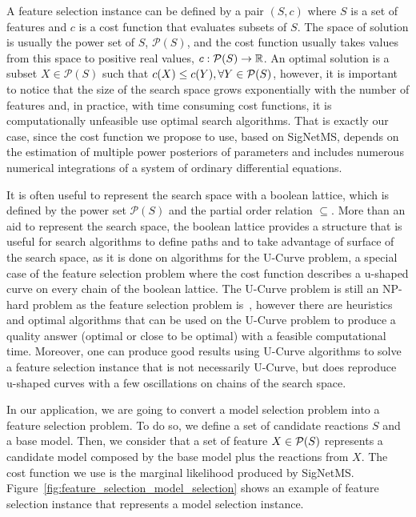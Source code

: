 A feature selection instance can be defined by a pair $(S, c)$ where $S$
is a set of features and $c$ is a cost function that evaluates subsets
of $S$. The space of solution is usually the power set of $S$,
$\mathcal{P}(S)$, and the cost function usually takes values from this 
space to positive real values, $c: \mathcal{P}(S) \to \mathbb{R}$. An
optimal solution is a subset $X \in \mathcal{P}(S)$ such that $c(X) \leq
c(Y), \forall Y \in \mathcal{P} (S)$, however, it is important to notice
that the size of the search space grows exponentially with the number of
features and, in practice, with time consuming cost functions, it is
computationally unfeasible use optimal search algorithms. That is
exactly our case, since the cost function we propose to use, based on
SigNetMS, depends on the estimation of multiple power posteriors of
parameters and includes numerous numerical integrations of a system of
ordinary differential equations.

It is often useful to represent the search space with a boolean lattice, 
which is defined by the power set $\mathcal{P}(S)$ and the partial order 
relation $\subseteq$. More than an aid to represent the search space,
the boolean lattice provides a structure that is useful for search
algorithms to define paths and to take advantage of surface of the 
search space, as it is done on algorithms for the U-Curve problem, a 
special case of the feature selection problem where the cost function 
describes a u-shaped curve on every chain of the boolean lattice. The
U-Curve problem is still an NP-hard problem as the feature selection
problem is~\cite{Rei12}, however there are heuristics and optimal
algorithms that can be used on the U-Curve problem to produce a quality
answer (optimal or close to be optimal) with a feasible computational
time. Moreover, one can produce good results using U-Curve algorithms to 
solve a feature selection instance that is not necessarily U-Curve, but
does reproduce u-shaped curves with a few oscillations on chains of the
search space.

In our application, we are going to convert a model selection problem
into a feature selection problem. To do so, we define a set of candidate
reactions $S$ and a base model. Then, we consider that a set of feature
$X \in \mathcal{P} (S)$ represents a candidate model composed by the base
model plus the reactions from $X$. The cost function we use is the
marginal likelihood produced by SigNetMS.
Figure~\ref{fig:feature_selection_model_selection} shows an example of
feature selection instance that represents a model selection instance.

